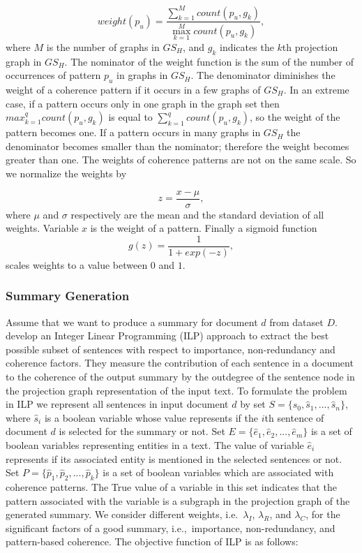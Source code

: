 \begin{equation}
\label{eq:ch-weight}
weight(p_u) = \frac{\sum_{k=1}^{M}{count(p_u,g_k)}}{\max_{k=1}^{M}{count(p_u,g_k)}},
\end{equation}
where $M$ is the number of graphs in $GS_H$, and $g_k$ indicates the $k$th projection graph in $GS_H$.
The nominator of the weight function is the sum of the number of occurrences of pattern $p_u$ in graphs in $GS_H$. 
The denominator diminishes the weight of a coherence pattern if it occurs in a few graphs of $GS_H$. 
In an extreme case, if a pattern occurs only in one graph in the graph set then $max_{k=1}^{q}{count(p_u,g_k)}$ is equal to $\sum_{k=1}^{q}{count(p_u,g_k)}$, so the weight of the pattern becomes one. 
If a pattern occurs in many graphs in $GS_H$ the denominator becomes smaller than the nominator; therefore the weight becomes greater than one. 
The weights of coherence patterns are not on the same scale.  
So we normalize the weights by 

\begin{equation}
z = \frac{x-\mu}{\sigma},
\end{equation}
where $\mu$ and $\sigma$ respectively are the mean and the standard deviation of all weights. Variable $x$ is the weight of a pattern.   
Finally a sigmoid function
\begin{equation}
 g(z) = \frac{1}{1+exp(-z)},
\end{equation}
scales weights to a value between $0$ and $1$. 

\subsubsection{Summary Generation}

Assume that we want to produce a summary for document $d$ from dataset $D$. 
 develop an Integer Linear Programming (ILP) approach to extract the best possible subset of sentences with respect to importance, non-redundancy and coherence factors. 
They measure the contribution of each sentence in a document to the coherence of the output summary by the outdegree of the sentence node in the projection graph representation of the input text.  
To formulate the problem in ILP we represent all sentences in input document $d$ by set 
$S = \lbrace \hat{s}_0, \hat{s}_1,..., \hat{s}_n \rbrace$, where $\hat{s}_i$ is a boolean variable whose value represents if the $i$th sentence of document $d$ is selected for the summary or not.  
Set $E=\lbrace \hat{e}_1, \hat{e}_2,..., \hat{e}_m \rbrace$ is a set of boolean variables representing entities in a text. 
The value of variable $\hat{e}_i$ represents if its associated entity is mentioned in the selected sentences or not. 
Set $P= \lbrace \hat{p}_1, \hat{p}_2,..., \hat{p}_k \rbrace$ is a set of boolean variables which are associated with coherence patterns. 
The True value of a variable in this set indicates that the pattern associated with the variable is a subgraph in the projection graph of the generated summary. 
We consider different weights, i.e.\ $\lambda_I$, $\lambda_R$, and $\lambda_C$, for the significant factors of a good summary, i.e.,\ importance, non-redundancy, and pattern-based coherence.  
The objective function of ILP is as follows: 

